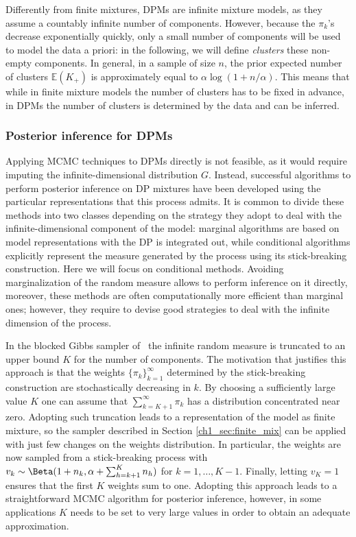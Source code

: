 Differently from finite mixtures, DPMs are infinite mixture models, as they assume a countably infinite number of components. 
However, because the $\pi_k$'s decrease exponentially quickly, only a small number of components will be used to model the
data a priori: in the following, we will define \textit{clusters} these non-empty components. In general, in a sample of size $n$, the prior expected number of clusters $\mathbb{E}(K_+)$ is approximately equal to $\alpha \log(1 + n/\alpha)$.
This means that while in finite mixture models the number of clusters has to be fixed in advance, in DPMs the number of clusters is determined by the data and can be inferred.

\subsubsection*{Posterior inference for DPMs}
Applying MCMC techniques to DPMs directly is not feasible, as it would require imputing the infinite-dimensional distribution $G$. Instead, successful algorithms to perform posterior inference on DP mixtures have been developed using the particular representations that this process admits. 
It is common to divide these methods into two classes depending on the strategy they adopt to deal with the infinite-dimensional component of the model: marginal algorithms are based on model representations with the DP is integrated out, while conditional algorithms explicitly represent the measure generated by the process using its stick-breaking construction.
Here we will focus on conditional methods. Avoiding marginalization of the random measure allows to perform inference on it directly, moreover, these methods are often computationally more efficient than marginal ones; however, they require to devise good strategies to deal with the infinite dimension of the process.

In the blocked Gibbs sampler of~\textcite{ishwaran2001} the infinite random measure is truncated to an upper bound $K$ for the number of components. The motivation that justifies this approach is that the weights $\{\pi_k\}_{k=1}^{\infty}$ determined by the stick-breaking construction are stochastically decreasing in $k$. By choosing a sufficiently large value $K$ one can assume that $\sum_{k=K +1}^{\infty} \pi_k$ has a distribution concentrated near zero.
Adopting such truncation leads to a representation of the model as finite mixture, so the sampler described in Section \ref{ch1_sec:finite_mix} can be applied with just few changes on the weights distribution. In particular, the weights are now sampled from a stick-breaking process with $v_k \sim \Beta(1+n_k, \alpha + \sum_{h=k+1}^{K} n_h)$ for $k = 1,\dots,K-1$. Finally, letting $v_K = 1$ ensures that the first $K$ weights sum to one. Adopting this approach leads to a straightforward MCMC algorithm for posterior inference, however, in some applications $K$ needs to be set to very large values in order to obtain an adequate approximation.

